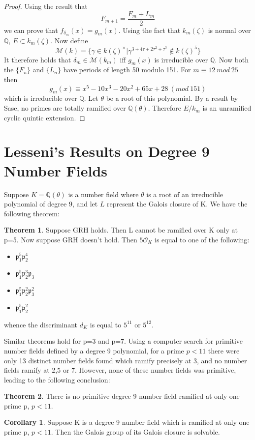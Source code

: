 \documentclass[12pt]{extarticle}
\newcommand{\Q}{\mathbb{Q}}
\newcommand{\<}{\langle}
\renewcommand{\>}{\rangle}
\theoremstyle{definition}
\newtheorem{theorem}{Theorem}
\newtheorem{corollary}{Corollary}
\begin{document}
\begin{proof}
Using the result that \begin{equation}
    F_{m+1}= \frac{F_m + L_m}{2}
\end{equation}
we can prove that $f_{\delta_m}(x) = g_m(x)$. Using the fact that $k_m(\zeta)$ is normal over $\Q$, $E\subset k_m(\zeta)$. Now define  \begin{equation}
    \mathcal{M}(k)=\{\gamma \in k(\zeta)^{\times}|\gamma^{3+4\tau+2\tau^{2}+\tau^3}\notin k(\zeta)^5\}
\end{equation}
It therefore holds that $\delta_m \in \mathcal{M}(k_m)$ iff $g_m(x)$ is irreducible over $\Q$. Now both the $\{F_n\}$ and $\{L_n\}$ have periods of length 50 modulo 151. For $m\equiv12 \: mod \: 25$ then \begin{equation}
    g_m(x) \equiv x^5 - 10x^3 - 20x^2 + 65x + 28\:(mod \:151)
\end{equation} which is irreducible over $\Q$. Let $\theta$ be a root of this polynomial. By a result by Sase, no primes are totally ramified over $\Q(\theta)$. Therefore $E/k_m$ is an unramified cyclic quintic extension. 
\end{proof}
\section{Lesseni's Results on Degree 9 Number Fields}
Suppose $K=\mathbb{Q}(\theta)$ is a number field where $\theta$ is a root of an irreducible polynomial of degree 9, and let $L$ represent the Galois closure of K. We have the following theorem: \begin{theorem}
    Suppose GRH holds. Then L cannot be ramified over K only at p=5. Now suppose GRH doesn't hold. Then $5\mathcal{O}_K$ is equal to one of the following: \begin{itemize}
        \item $\mathfrak{p}_1^5\mathfrak{p}_2^4$
        \item $\mathfrak{p}_1^5\mathfrak{p}_2^3\mathfrak{p}_3$
        \item $\mathfrak{p}_1^5\mathfrak{p}_2^2\mathfrak{p}_3^2$
        \item  $\mathfrak{p}_1^5\mathfrak{p}_2^2$
    \end{itemize}
    whence the discriminant $d_K$ is equal to $5^{11}$ or $5^{12}$. 
\end{theorem}
Similar theorems hold for p=3 and p=7.  Using a computer search for primitive number fields defined by a degree 9 polynomial, for a prime $p<11$ there were only 13 distinct number fields found which ramify precisely at 3, and no number fields ramify at 2,5 or 7. However, none of these number fields was primitive, leading to the following conclusion:
\begin{theorem}
    There is no primitive degree 9 number field ramified at only one prime p, $p<11$.
\end{theorem}
\begin{corollary}
 Suppose K is a degree 9 number field which is ramified at only one prime p, $p<11$. Then the Galois group of its Galois closure is solvable. 
\end{corollary}
\end{document}
